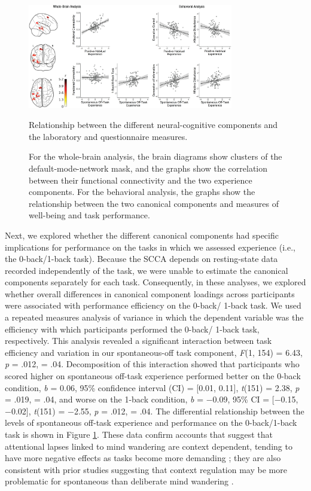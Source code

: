 \begin{figure}
	\centering
	\includegraphics[width=0.8\textwidth]{chapters/img/study1fig4.jpeg}
	\caption{Relationship between the different neural-cognitive components and the laboratory and questionnaire measures.}
	\caption*{For the whole-brain analysis, the brain diagrams show clusters of the default-mode-network mask, and the graphs show the correlation between their functional connectivity and the two experience components. For the behavioral analysis, the graphs show the relationship between the two canonical components and measures of well-being and task performance.}

	\label{fig:study1:fig4}
\end{figure}

Next, we explored whether the different canonical components had specific implications for performance on the tasks in which we assessed experience (i.e., the 0-back/1-back task). Because the SCCA depends on resting-state data recorded independently of the task, we were unable to estimate the canonical components separately for each task. Consequently, in these analyses, we explored whether overall differences in canonical component loadings across participants were associated with performance efficiency on the 0-back/ 1-back task. We used a repeated measures analysis of variance in which the dependent variable was the efficiency with which participants performed the 0-back/ 1-back task, respectively. This analysis revealed a significant interaction between task efficiency and variation in our spontaneous-off task component, \textit{F}(1, 154) = 6.43, \textit{p} = .012, \paretasquared = .04. Decomposition of this interaction showed that participants who scored higher on spontaneous off-task experience performed better on the 0-back condition, \textit{b} = 0.06, 95\% confidence interval (CI) = [0.01, 0.11], \textit{t}(151) = 2.38, \textit{p} = .019, \paretasquared = .04, and worse on the 1-back condition, \textit{b} = −0.09, 95\% CI = [−0.15, −0.02], \textit{t}(151) = −2.55, \textit{p} = .012, \paretasquared = .04. The differential relationship between the levels of spontaneous off-task experience and performance on the 0-back/1-back task is shown in Figure \ref{fig:study1:fig4}. These data confirm accounts that suggest that attentional lapses linked to mind wandering are context dependent, tending to have more negative effects as tasks become more demanding \cite{Smallwood2013a}; they are also consistent with prior studies suggesting that context regulation may be more problematic for spontaneous than deliberate mind wandering \cite<see also>{Seli2016}.

